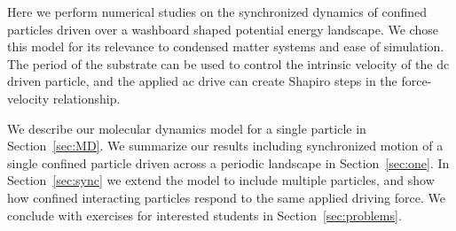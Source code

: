 \documentclass[twocolumn,preprintnumbers,amsmath,amssymb,aps,prx]{revtex4}
\begin{document}
Here we perform numerical studies 
on the synchronized dynamics
of confined particles driven over
a washboard shaped potential energy landscape.
We chose this model for its
relevance to condensed matter systems
and ease of simulation.
The period of the substrate
can be used to control the
intrinsic velocity of the dc driven particle,
and the applied ac drive can
create Shapiro steps in the force-velocity relationship.



We describe
our molecular dynamics model for a single particle in Section~\ref{sec:MD}.
We summarize
our results 
including synchronized motion of a single confined particle
driven across a periodic landscape in 
Section~\ref{sec:one}.
In Section~\ref{sec:sync}
we 
extend the model to include multiple particles,
and show how confined 
interacting particles respond to the same applied driving force.
We conclude with
exercises for interested students 
in Section~\ref{sec:problems}.
\end{document}
